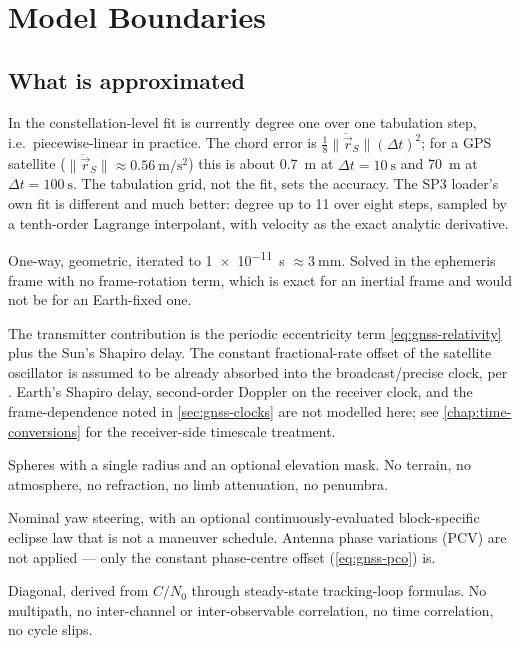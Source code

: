 \section{Model Boundaries}
\label{sec:gnss-boundaries}

\subsection{What is approximated}

\begin{description}[leftmargin=1.4em,style=nextline,font=\normalfont\itshape]
  \item[Transmitter ephemeris interpolation]
    In  the constellation-level fit is currently
    degree one over one tabulation step, i.e.\ piecewise-linear in practice.
    The
    chord error is $\tfrac{1}{8}\lVert\ddot{\vec{r}}_S\rVert (\Delta t)^2$;
    for a GPS satellite ($\lVert\ddot{\vec{r}}_S\rVert \approx
    \SI{0.56}{\meter\per\second\squared}$) this is about \SI{0.7}{\meter} at
    $\Delta t = \SI{10}{\second}$ and \SI{70}{\meter} at
    $\Delta t = \SI{100}{\second}$. The tabulation grid, not the fit, sets the
    accuracy. The SP3 loader's own fit is different and much better: degree up
    to 11 over eight steps, sampled by a tenth-order Lagrange interpolant,
    with velocity as the exact analytic derivative.
  \item[Light time]
    One-way, geometric, iterated to \SI{1e-11}{\second} $\approx
    \SI{3}{\milli\meter}$. Solved in the ephemeris frame with no
    frame-rotation term, which is exact for an inertial frame and would not be
    for an Earth-fixed one.
  \item[Relativity]
    The transmitter contribution is the periodic
    eccentricity term \cref{eq:gnss-relativity} plus the Sun's Shapiro delay.
    The constant fractional-rate offset of the satellite oscillator is assumed
    to be already absorbed into the broadcast/precise clock, per
    \citet{icdgps200}. Earth's Shapiro delay, second-order Doppler on the
    receiver clock, and the frame-dependence noted in
    \cref{sec:gnss-clocks} are not modelled here; see
    \cref{chap:time-conversions} for the receiver-side timescale treatment.
  \item[Occulting bodies]
    Spheres with a single radius and an optional elevation mask. No terrain,
    no atmosphere, no refraction, no limb attenuation, no penumbra.
  \item[Transmitter attitude]
    Nominal yaw steering, with an optional continuously-evaluated
    block-specific eclipse law that is not a maneuver schedule. Antenna phase
    variations (PCV) are not applied --- only the constant phase-centre offset
    (\cref{eq:gnss-pco}) is.
  \item[Noise]
    Diagonal, derived from $C/N_0$ through steady-state tracking-loop
    formulas. No multipath, no inter-channel or inter-observable correlation,
    no time correlation, no cycle slips.
\end{description}

